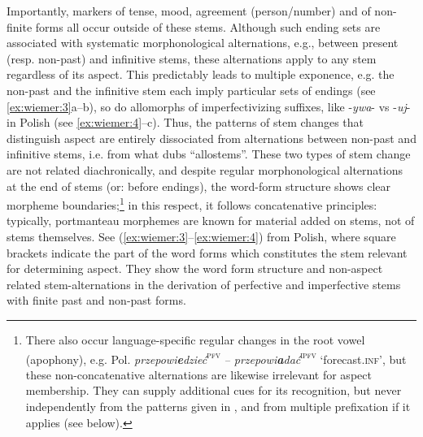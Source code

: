 \documentclass[output=paper]{langscibook}
\begin{document}
Importantly, markers of tense, mood, agreement (person/number) and of non-finite forms all occur outside of these stems. Although such ending sets are associated with systematic morphonological alternations, e.g., between present (resp. non-past) and infinitive stems, these alternations apply to any stem regardless of its aspect. This predictably leads to multiple exponence, e.g. the non-past and the infinitive stem each imply particular sets of endings (see \ref{ex:wiemer:3}a--b), so do allomorphs of imperfectivizing suffixes, like -\textit{ywa}{}- vs -\textit{uj}{}- in Polish (see \ref{ex:wiemer:4}--c). Thus, the patterns of stem changes that distinguish aspect are entirely dissociated from alternations between non-past and infinitive stems, i.e. from what \citet[199]{Brown1998} dubs ``allostems''. These two types of stem change are not related diachronically, and despite regular morphonological alternations at the end of stems (or: before endings), the word-form structure shows clear morpheme boundaries;\footnote{There also occur language-specific regular changes in the root vowel (apophony), e.g. Pol. \textit{przepowi}\textrm{\textbf{\textit{e}}}\textrm{\textit{dzieć}}\textrm{\textsc{\textsuperscript{pfv}}} \textit{– przepowi}\textrm{\textbf{\textit{a}}}\textrm{\textit{dać}}\textrm{\textsc{\textsuperscript{ipfv}}} \textrm{‘forecast.}\textsc{inf}’, but these non-concatenative alternations are likewise irrelevant for aspect membership. They can supply additional cues for its recognition, but never independently from the patterns given in , and from multiple prefixation if it applies (see below).} in this respect, it follows concatenative principles: typically, portmanteau morphemes are known for material added on stems, not of stems themselves. See (\ref{ex:wiemer:3}--\ref{ex:wiemer:4}) from Polish, where square brackets indicate the part of the word forms which constitutes the stem relevant for determining aspect. They show the word form structure and non-aspect related stem-alternations in the derivation of perfective and imperfective stems with finite past and non-past forms.
\end{document}
